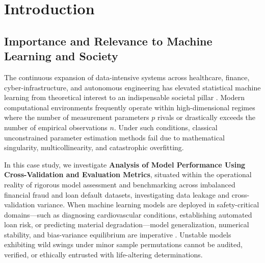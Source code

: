 \section{Introduction}

\subsection{Importance and Relevance to Machine Learning and Society}
The continuous expansion of data-intensive systems across healthcare, finance, cyber-infrastructure, and autonomous engineering has elevated statistical machine learning from theoretical interest to an indispensable societal pillar \cite{hastie2009}. Modern computational environments frequently operate within high-dimensional regimes where the number of measurement parameters $p$ rivals or drastically exceeds the number of empirical observations $n$. Under such conditions, classical unconstrained parameter estimation methods fail due to mathematical singularity, multicollinearity, and catastrophic overfitting.

In this case study, we investigate \textbf{Analysis of Model Performance Using Cross-Validation and Evaluation Metrics}, situated within the operational reality of rigorous model assessment and benchmarking across imbalanced financial fraud and loan default datasets, investigating data leakage and cross-validation variance. When machine learning models are deployed in safety-critical domains---such as diagnosing cardiovascular conditions, establishing automated loan risk, or predicting material degradation---model generalization, numerical stability, and bias-variance equilibrium are imperative \cite{breiman2001}. Unstable models exhibiting wild swings under minor sample permutations cannot be audited, verified, or ethically entrusted with life-altering determinations.

